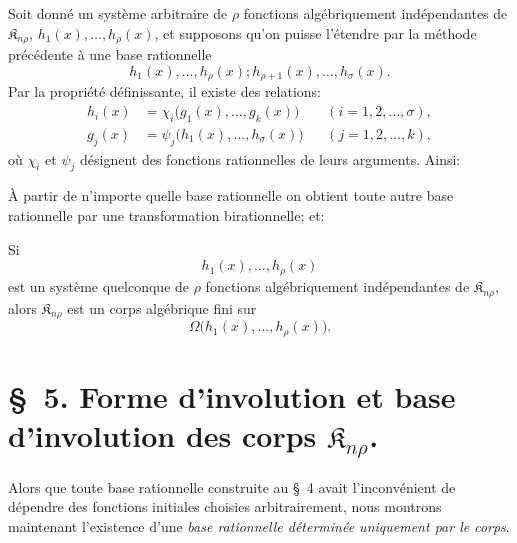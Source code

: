 \documentclass[11pt]{article}
\providecommand{\Kfield}{\mathfrak{K}}
\begin{document}
Soit donné un système arbitraire de $\rho$ fonctions algébriquement indépendantes de $\Kfield_{n\rho}$, $h_1(x),\ldots,h_\rho(x)$, et supposons qu'on puisse l'étendre par la méthode précédente à une base rationnelle
\[
  h_1(x),\ldots,h_\rho(x);
  h_{\rho+1}(x),\ldots,h_\sigma(x).
\]
Par la propriété définissante, il existe des relations:
\[
\begin{aligned}
  h_i(x)&=\chi_i\bigl(g_1(x),\ldots,g_k(x)\bigr)
    &&(i=1,2,\ldots,\sigma),\\
  g_j(x)&=\psi_j\bigl(h_1(x),\ldots,h_\sigma(x)\bigr)
    &&(j=1,2,\ldots,k),
\end{aligned}
\]
où $\chi_i$ et $\psi_j$ désignent des fonctions rationnelles de leurs arguments. Ainsi:

À partir de n'importe quelle base rationnelle on obtient toute autre base rationnelle par une transformation birationnelle; et:

Si
\[
  h_1(x),\ldots,h_\rho(x)
\]
est un système quelconque de $\rho$ fonctions algébriquement indépendantes de $\Kfield_{n\rho}$, alors $\Kfield_{n\rho}$ est un corps algébrique fini sur
\[
  \Omega\bigl(h_1(x),\ldots,h_\rho(x)\bigr).
\]

\section*{\S\ 5. Forme d'involution et base d'involution des corps $\Kfield_{n\rho}$.}

Alors que toute base rationnelle construite au \S\ 4 avait l'inconvénient de dépendre des fonctions initiales choisies arbitrairement, nous montrons maintenant l'existence d'une \emph{base rationnelle déterminée uniquement par le corps}.
\end{document}
